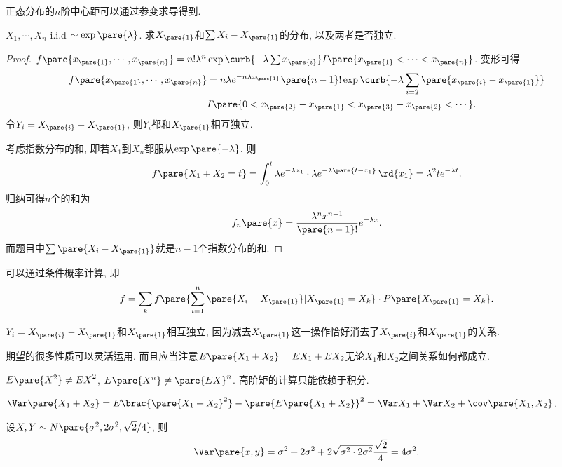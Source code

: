 \documentclass{ctexart}
\begin{document}
\begin{remark}
    正态分布的$n$阶中心距可以通过参变求导得到.
\end{remark}
\begin{ex}
    $X_1, \cdots, X_n$ i.i.d $\sim \exp\pare{\lambda}$. 求$X_{\pare{1}}$和$\sum X_i - X_{\pare{1}}$的分布, 以及两者是否独立.
\end{ex}
\begin{proof}
    $f\pare{x_{\pare{1}}, \cdots, x_{\pare{n}}} = n! \lambda^n \exp\curb{-\lambda \sum x_{\pare{i}}} I\pare{x_{\pare{1}}< \cdots < x_{\pare{n}}}$. 变形可得
    \begin{align*}
        f\pare{x_{\pare{1}}, \cdots, x_{\pare{n}}} &= n\lambda e^{-n\lambda x_{\pare{1}}} \pare{n-1}! \exp\curb{-\lambda \sum_{i=2} \pare{x_{\pare{i}} - x_{\pare{1}}}}\\ & I\pare{0 < x_{\pare{2}} - x_{\pare{1}} < x_{\pare{3}} - x_{\pare{2}} < \cdots}. 
    \end{align*}
    令$Y_i = X_{\pare{i}} - X_{\pare{1}}$, 则$Y_i$都和$X_{\pare{1}}$相互独立.
    \par
    考虑指数分布的和, 即若$X_1$到$X_n$都服从$\exp\pare{-\lambda}$, 则
    \[ f\pare{X_1+X_2 = t} = \int_0^t \lambda e^{-\lambda x_1} \cdot \lambda e^{-\lambda\pare{t-x_1}}\,\rd{x_1} = \lambda^2 te^{-\lambda t}. \]
    归纳可得$n$个的和为
    \[ f_n\pare{x} = \frac{\lambda^n x^{n-1}}{\pare{n-1}!} e^{-\lambda x}. \]
    而题目中$\sum \pare{X_i - X_{\pare{1}}}$就是$n-1$个指数分布的和.
\end{proof}
\begin{remark}
    可以通过条件概率计算, 即
    \[ f = \sum_k f\pare{\sum_{i=1}^n \pare{X_i - X_{\pare{1}}}\vert X_{\pare{1}} = X_k}\cdot P\pare{X_{\pare{1}} = X_k}. \]
\end{remark}
\begin{remark}
    $Y_i = X_{\pare{i}} - X_{\pare{1}}$和$X_{\pare{1}}$相互独立, 因为减去$X_{\pare{1}}$这一操作恰好消去了$X_{\pare{i}}$和$X_{\pare{1}}$的关系.
\end{remark}
期望的很多性质可以灵活运用. 而且应当注意$E\pare{X_1 + X_2} = EX_1 + EX_2$无论$X_1$和$X_2$之间关系如何都成立.
\begin{pitfall}
    $E\pare{X^2} \neq {EX}^2$, $E\pare{X^n} \neq \pare{EX}^n$. 高阶矩的计算只能依赖于积分.
\end{pitfall}
$\Var\pare{X_1+X_2} = E\brac{\pare{X_1+X_2}^2} - \pare{E\pare{X_1 + X_2}}^2 = \Var X_1 + \Var X_2 + \cov\pare{X_1, X_2}$.
\begin{ex}
    设$X,Y\sim N\pare{\sigma^2, 2\sigma^2, \sqrt{2}/4}$, 则
    \[ \Var\pare{x,y} = \sigma^2 + 2\sigma^2 + 2\sqrt{\sigma^2 \cdot 2\sigma^2} \frac{\sqrt{2}}{4} = 4\sigma^2. \]
\end{ex}
\end{document}

